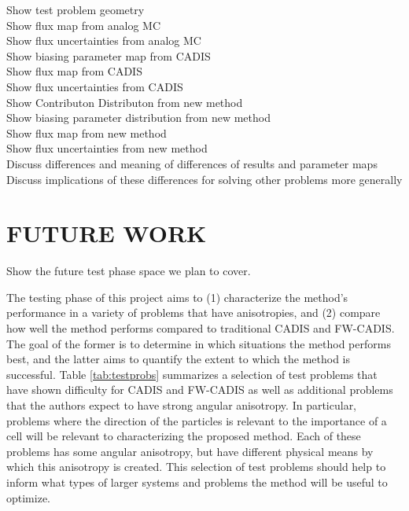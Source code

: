 \documentclass[12pt]{article}
\begin{document}
Show test problem geometry
\\ Show flux map from analog MC
\\ Show flux uncertainties from analog MC
\\ Show biasing parameter map from CADIS
\\ Show flux map from CADIS
\\ Show flux uncertainties from CADIS
\\ Show Contributon Distributon from new method
\\ Show biasing parameter distribution from new method
\\ Show flux map from new method
\\ Show flux uncertainties from new method
\\ Discuss differences and meaning of differences of results and parameter maps
\\ Discuss implications of these differences for solving other problems more generally

%
\section{FUTURE WORK} 
\label{sect::future}

Show the future test phase space we plan to cover. 

The testing phase of this project aims to (1) characterize the method's performance in a variety of problems that have anisotropies, and (2) compare how well the method performs compared to traditional CADIS and FW-CADIS.
The goal of the former is to determine in which situations the method performs best, and the latter aims to quantify the extent to which the method is successful. 
Table \ref{tab:testprobs} summarizes a selection of test problems that have shown difficulty for CADIS and FW-CADIS as well as additional problems that the authors expect to have strong angular anisotropy. 
In particular, problems where the direction of the particles is relevant to the importance of a cell will be relevant to characterizing the proposed method. 
Each of these problems has some angular anisotropy, but have different physical means by which this anisotropy is created. 
This selection of test problems should help to inform what types of larger systems and problems the method will be useful to optimize. 
\end{document}

